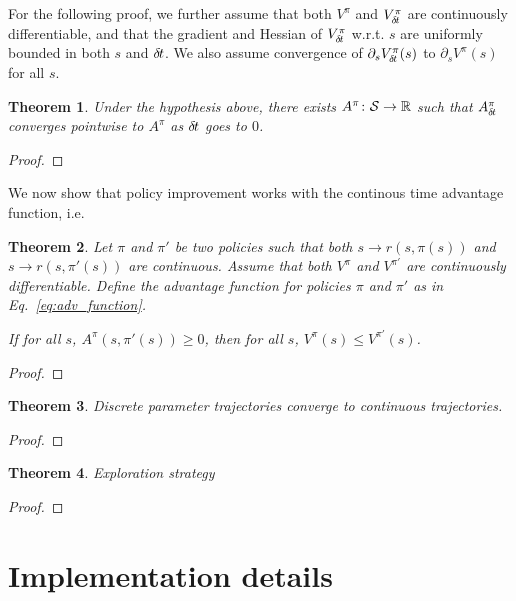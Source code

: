 \documentclass[11pt]{article}
\newtheorem{theorem}{Theorem}
\begin{document}
For the following proof, we further assume that both $V^\pi$ and
$V^\pi_{\delta\hspace{-.1em}t}$ are continuously differentiable, and that the gradient and
Hessian of $V^\pi_{\delta\hspace{-.1em}t}$ w.r.t. $s$ are uniformly bounded in both $s$ and ${\delta\hspace{-.1em}t}$.
We also assume convergence of $\partial_s V^\pi_{\delta\hspace{-.1em}t}(s)$ to $\partial_s V^\pi(s)$ for
all $s$.

\begin{theorem}
	Under the hypothesis above, there exists $A^\pi\colon {\cal S} \rightarrow
	\mathbb{R}$ such that $A^\pi_{\delta\hspace{-.1em}t}$ converges pointwise to $A^\pi$ as
	${\delta\hspace{-.1em}t}$ goes to $0$. 
\end{theorem}

\begin{proof}
	
\end{proof}

We now show that policy improvement works with the continous time advantage function, i.e.\
\begin{theorem}
	Let $\pi$ and $\pi'$ be two policies such that both $s \rightarrow r(s, \pi(s))$ and
	$s \rightarrow r(s, \pi'(s))$ are continuous.
	Assume that both $V^\pi$ and $V^{\pi'}$ are continuously differentiable.
	Define the advantage function for policies $\pi$ and $\pi'$ as in Eq.~\eqref{eq:adv_function}.

	If for all $s$, $A^\pi(s, \pi'(s)) \geq 0$, then for all $s$,
	$V^\pi(s) \leq V^{\pi'}(s)$. 
\end{theorem}

\begin{proof}
	
\end{proof}
\begin{theorem}
	Discrete parameter trajectories converge to continuous trajectories.
\end{theorem}
\begin{proof}
	
      \end{proof}

      \begin{theorem}
	Exploration strategy
\end{theorem}
\begin{proof}
	
\end{proof}
\section{Implementation details}

\end{document}
